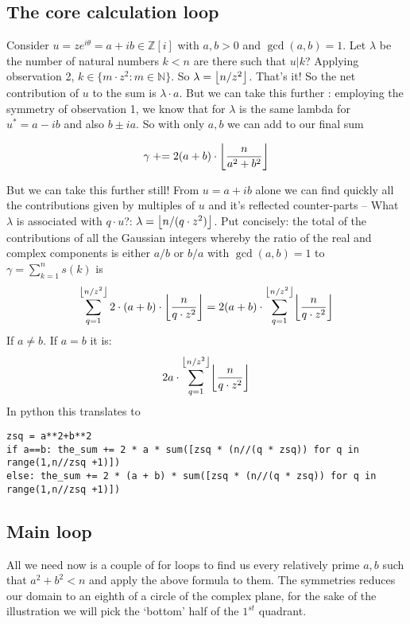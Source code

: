 \documentclass[11pt]{article}
\newcommand{\N}{\mathbb{N}}
\newcommand{\Z}{\mathbb{Z}}
\DeclarePairedDelimiter\floor{\lfloor}{\rfloor}
\begin{document}
\subsection{The core calculation loop}
Consider $u = ze^{i\theta} = a+ib\in\Z[i]$ with $a,b>0$ and $\gcd(a,b)=1$. Let $\lambda$ be the number of natural numbers $k<n$ are there such that $u|k$? Applying observation 2, $k\in\{m\cdot z^2 : m\in\N\}$. So $\lambda = \floor*{n/z^2}$. That's it! So the net contribution of $u$ to the sum is $\lambda\cdot a$. But we can take this further : employing the symmetry of observation 1, we know that for $\lambda$ is the same lambda for $u^* = a - ib$ and also $b \pm ia$. So with only $a,b$ we can add to our final sum

$$
\gamma \mspace{5mu} + \mspace{-5mu}= 2 (a+b) \cdot \floor*{\frac{n}{a^2+b^2}}
$$

But we can take this further still! From $u = a+ib$ alone we can find quickly all the contributions given by multiples of $u$ and it's reflected counter-parts -- What $\lambda$ is associated with $q\cdot u$?: $\lambda = \floor*{n/(q\cdot z^2)}$. Put concisely: the total of the contributions of all the Gaussian integers whereby the ratio of the real and complex components is either $a/b$ or $b/a$ with $\gcd(a,b)=1$ to $\gamma = \sum_{k=1}^{n} s(k)$ is
$$
\sum_{q=1}^{\floor*{n/z^2}} 2\cdot (a+b)\cdot \floor*{\frac{n}{q\cdot z^2}} = 
2 (a+b)\cdot \sum_{q=1}^{\floor*{n/z^2}} \floor*{\frac{n}{q\cdot z^2}}
$$
If $a\neq b$. If $a=b$ it is:
$$
2 a\cdot \sum_{q=1}^{\floor*{n/z^2}} \floor*{\frac{n}{q\cdot z^2}}
$$
In python this translates to
\lstset{frame=btlr}
\begin{lstlisting}
zsq = a**2+b**2
if a==b: the_sum += 2 * a * sum([zsq * (n//(q * zsq)) for q in range(1,n//zsq +1)])
else: the_sum += 2 * (a + b) * sum([zsq * (n//(q * zsq)) for q in range(1,n//zsq +1)])
\end{lstlisting}

\subsection{Main loop}

All we need now is a couple of for loops to find us every relatively prime $a,b$ such that $a^2+b^2 < n$ and apply the above formula to them. The symmetries reduces our domain to an eighth of a circle of the complex plane, for the sake of the illustration we will pick the `bottom' half of the $1^{st}$ quadrant.

\end{document}
